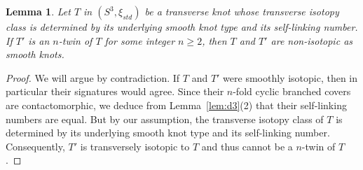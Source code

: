 \documentclass[10pt,a4paper]{amsart}
\newtheorem{lemma}{Lemma}
\begin{document}
\begin{lemma}\label{lem:same_sl}
    Let $T$ in $(S^3,\xi_{std})$ be a transverse knot whose transverse isotopy class is determined by its underlying smooth knot type and its self-linking number. If $T'$ is an $n$-twin of $T$ for some integer $n\geq2$, then $T$ and $T'$ are non-isotopic \emph{as smooth knots}. 
\end{lemma}

\begin{proof}
We will argue by contradiction. If $T$ and $T'$ were smoothly isotopic, then in particular their signatures would agree. Since their $n$-fold cyclic branched covers are contactomorphic, we deduce from Lemma~\ref{lem:d3}(2) that their self-linking numbers are equal. But by our assumption, the transverse isotopy class of $T$ is determined by its underlying smooth knot type and its self-linking number. Consequently, $T'$ is transversely isotopic to $T$ and thus cannot be a  $n$-twin of $T$.
\end{proof}
\end{document}
